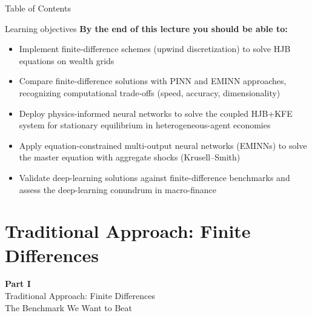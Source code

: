 \documentclass[aspectratio=169,11pt]{beamer}
\begin{document}
\begin{frame}{Table of Contents}
\tableofcontents[hideallsubsections]
\end{frame}

\begin{frame}{Learning objectives}
\textbf{By the end of this lecture you should be able to:}
\begin{itemize}
  \item Implement finite-difference schemes (upwind discretization) to solve HJB equations on wealth grids
  \item Compare finite-difference solutions with PINN and EMINN approaches, recognizing computational trade-offs (speed, accuracy, dimensionality)
  \item Deploy physics-informed neural networks to solve the coupled HJB+KFE system for stationary equilibrium in heterogeneous-agent economies
  \item Apply equation-constrained multi-output neural networks (EMINNs) to solve the master equation with aggregate shocks (Krusell--Smith)
  \item Validate deep-learning solutions against finite-difference benchmarks and assess the deep-learning conundrum in macro-finance
\end{itemize}
\end{frame}



\section{Traditional Approach: Finite Differences}

\begin{frame}{}
\vfill
\begin{center}
{\Huge \textcolor{uzhblue}{\textbf{Part I}}}\\[12pt]
{\LARGE Traditional Approach: Finite Differences}\\[6pt]
{\large The Benchmark We Want to Beat}
\end{center}
\vfill
\end{frame}
\end{document}
